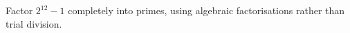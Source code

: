 Factor $2^{12}-1$ completely into primes, using algebraic factorisations rather than trial division.
